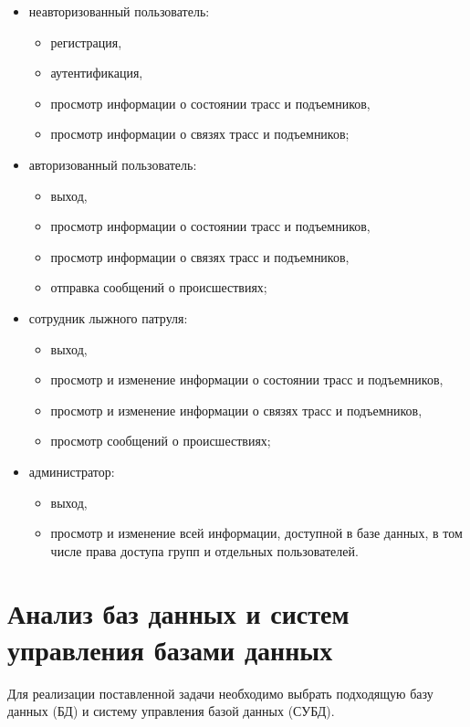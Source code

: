 \begin{itemize}
	
	\item неавторизованный пользователь:
	\begin{itemize}
		\item регистрация,
		\item аутентификация,
		\item просмотр информации о состоянии трасс и подъемников,
		\item просмотр информации о связях трасс и подъемников;
	\end{itemize}
	
	\item авторизованный пользователь:
	\begin{itemize}
		\item выход,
		\item просмотр информации о состоянии трасс и подъемников,
		\item просмотр информации о связях трасс и подъемников,
		\item отправка сообщений о происшествиях;
	\end{itemize}
	
	\item сотрудник лыжного патруля:
	\begin{itemize}
		\item выход,
		\item просмотр и изменение информации о состоянии трасс и подъемников,
		\item просмотр и изменение информации о связях трасс и подъемников,
		\item просмотр сообщений о происшествиях;
	\end{itemize}
	
	\item администратор:
	\begin{itemize}
		\item выход,
		\item просмотр и изменение всей 
		информации, доступной в базе данных, в том числе права доступа групп и отдельных пользователей.
	\end{itemize}
\end{itemize}

\section{Анализ баз данных и систем управления базами данных}

Для реализации поставленной задачи необходимо выбрать подходящую базу данных (БД) и систему управления базой данных (СУБД). 

